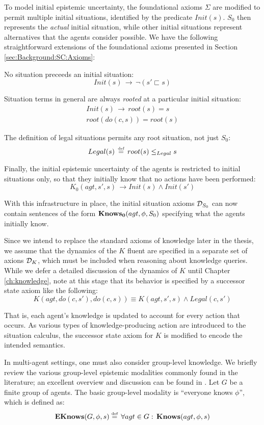To model initial epistemic uncertainty, the foundational axioms $\Sigma$
are modified to permit multiple initial situations, identified by
the predicate $Init(s)$. $S_{0}$ then represents the \emph{actual}
initial situation, while other initial situations represent alternatives
that the agents consider possible. We have the following straightforward
extensions of the foundational axioms presented in Section \ref{sec:Background:SC:Axioms}:

No situation preceeds an initial situation:\[
Init(s)\,\rightarrow\,\neg(s'\sqsubset s)\]


Situation terms in general are always \emph{rooted} at a particular
initial situation:\begin{gather*}
Init(s)\,\rightarrow\, root(s)=s\\
root(do(c,s))=root(s)\end{gather*}


The definition of legal situations permits any root situation, not
just $S_{0}$:\[
Legal(s)\,\stackrel{\mbox{\tiny def}}{=}\, root(s)\leq_{Legal}s\]


Finally, the initial epistemic uncertainty of the agents is restricted
to initial situations only, so that they initially know that no actions
have been performed:\[
K_{0}(agt,s',s)\,\rightarrow Init(s)\wedge Init(s')\]


With this infrastructure in place, the initial situation axioms $\mathcal{D}_{S_{0}}$
can now contain sentences of the form $\mathbf{Knows_{0}}(agt,\phi,S_{0})$ specifying
what the agents initially know.

Since we intend to replace the standard axioms of knowledge later
in the thesis, we assume that the dynamics of the $K$ fluent are
specified in a separate set of axions $\mathcal{D}_{K}$, which must be included
when reasoning about knowledge queries. While we defer a detailed
discussion of the dynamics of $K$ until Chapter \ref{ch:knowledge},
note at this stage that its behavior is specified by a successor state
axiom like the following:\[
K(agt,do(c,s'),do(c,s))\equiv K(agt,s',s)\wedge Legal(c,s')\]


That is, each agent's knowledge is updated to account for every action
that occurs. As various types of knowledge-producing action are introduced
to the situation calculus, the successor state axiom for $K$ is modified
to encode the intended semantics.

In multi-agent settings, one must also consider group-level knowledge.
We briefly review the various group-level epistemic modalities commonly
found in the literature; an excellent overview and discussion can
be found in \citep{halpern90knowledge_distrib}. Let $G$ be a finite
group of agents. The basic group-level modality is {}``everyone knows
$\phi$'', which is defined as:\[
\mathbf{EKnows}(G,\phi,s)\stackrel{\mbox{\tiny def}}{=}\,\forall agt\in G:\,\mathbf{Knows}(agt,\phi,s)\]


